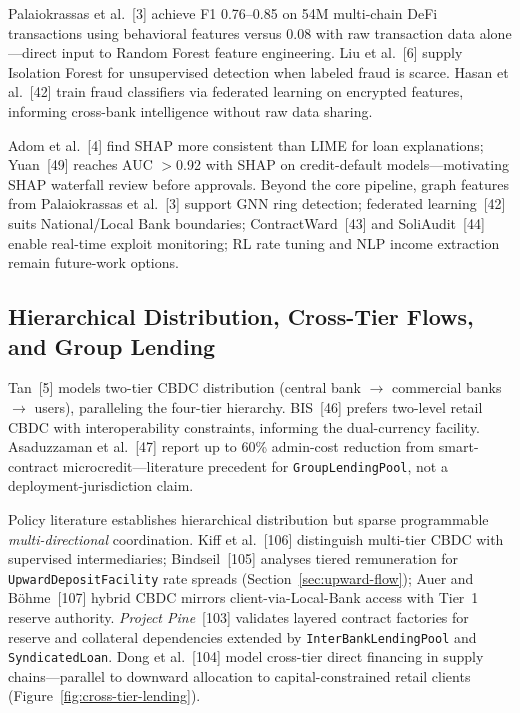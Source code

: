 \documentclass[12pt, a4paper]{report}
\begin{document}
Palaiokrassas et al.~[3] achieve F1 0.76--0.85 on 54M multi-chain DeFi transactions using behavioral features versus 0.08 with raw transaction data alone---direct input to Random Forest feature engineering. Liu et al.~[6] supply Isolation Forest for unsupervised detection when labeled fraud is scarce. Hasan et al.~[42] train fraud classifiers via federated learning on encrypted features, informing cross-bank intelligence without raw data sharing.

Adom et al.~[4] find SHAP more consistent than LIME for loan explanations; Yuan~[49] reaches AUC $>$0.92 with SHAP on credit-default models---motivating SHAP waterfall review before approvals. Beyond the core pipeline, graph features from Palaiokrassas et al.~[3] support GNN ring detection; federated learning~[42] suits National/Local Bank boundaries; ContractWard~[43] and SoliAudit~[44] enable real-time exploit monitoring; RL rate tuning and NLP income extraction remain future-work options.

\subsection{Hierarchical Distribution, Cross-Tier Flows, and Group Lending}
\label{sec:lit-cross-tier}

Tan~[5] models two-tier CBDC distribution (central bank $\to$ commercial banks $\to$ users), paralleling the four-tier hierarchy. BIS~[46] prefers two-level retail CBDC with interoperability constraints, informing the dual-currency facility. Asaduzzaman et al.~[47] report up to 60\% admin-cost reduction from smart-contract microcredit---literature precedent for \texttt{GroupLendingPool}, not a deployment-jurisdiction claim.

Policy literature establishes hierarchical distribution but sparse programmable \emph{multi-directional} coordination. Kiff et al.~[106] distinguish multi-tier CBDC with supervised intermediaries; Bindseil~[105] analyses tiered remuneration for \texttt{UpwardDepositFacility} rate spreads (Section~\ref{sec:upward-flow}); Auer and B\"{o}hme~[107] hybrid CBDC mirrors client-via-Local-Bank access with Tier~1 reserve authority. \textit{Project Pine}~[103] validates layered contract factories for reserve and collateral dependencies extended by \texttt{InterBankLendingPool} and \texttt{SyndicatedLoan}. Dong et al.~[104] model cross-tier direct financing in supply chains---parallel to downward allocation to capital-constrained retail clients (Figure~\ref{fig:cross-tier-lending}).
\end{document}
